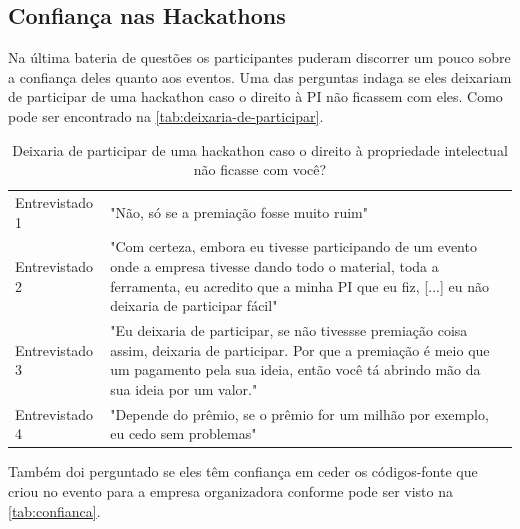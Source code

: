 \subsection{Confiança nas Hackathons}

Na última bateria de questões os participantes puderam discorrer um pouco sobre a confiança deles quanto aos eventos. Uma das perguntas indaga se eles deixariam de participar de uma hackathon caso o direito à PI não ficassem com eles. Como pode ser encontrado na \autoref{tab:deixaria-de-participar}.

\begin{table}[H]
\centering
\caption{Deixaria de participar de uma hackathon caso o direito à propriedade intelectual não ficasse com você?}
\label{tab:deixaria-de-participar}
\begin{tabular}{l|p{}}
Entrevistado 1 & "Não, só se a premiação fosse muito ruim"                                         \\
Entrevistado 2 &
  "Com certeza, embora eu tivesse participando de um evento onde a empresa tivesse dando todo o material, toda a ferramenta, eu acredito que a minha PI que eu fiz, {[}...{]} eu não deixaria de participar fácil" \\
Entrevistado 3 &
  "Eu deixaria de participar, se não tivessse premiação coisa assim, deixaria de participar. Por que a premiação é meio que um pagamento pela sua ideia, então você tá abrindo mão da sua ideia por um valor." \\
Entrevistado 4 & "Depende do prêmio, se o prêmio for um milhão por exemplo, eu cedo sem problemas"
\end{tabular}
\end{table}



Também doi perguntado se eles têm confiança em ceder os códigos-fonte que criou no evento para a empresa organizadora conforme pode ser visto na \autoref{tab:confianca}.

